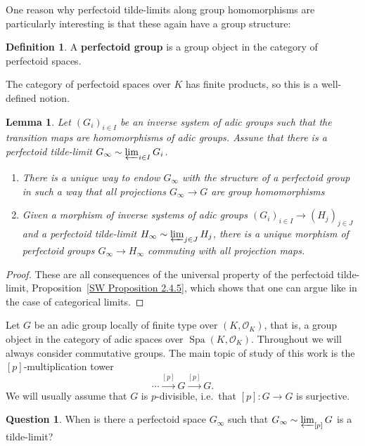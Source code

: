 \documentclass[10pt,oneside]{amsart}
\newtheorem{lemma}[theorem]{Lemma}
\theoremstyle{definition}
\newtheorem{definition}[theorem]{Definition}
\newtheorem{question}[theorem]{Question}
\newcommand{\Spa}{\operatorname{Spa}}
\renewcommand{\O}{\mathcal{O}}
\begin{document}
One reason why perfectoid tilde-limits along group homomorphisms are particularly interesting is that these again have a group structure:

\begin{definition}
	A \textbf{perfectoid group} is a group object in the category of perfectoid spaces.
\end{definition}
The category of perfectoid spaces over $K$ has finite products, so this is a well-defined notion.

\begin{lemma}\label{perfectoid tilde-limit is perfectoid group in a functorial way}
	Let $(G_i)_{i\in I}$ be an inverse system of adic groups such that the transition maps are homomorphisms of adic groups. Assune that there is a perfectoid tilde-limit $G_\infty\sim \varprojlim_{i\in I}G_i$.
	\begin{enumerate}
		\item  There is a unique way to endow $G_\infty$ with the structure of a perfectoid group in such a way that all projections $G_\infty\rightarrow G$ are group homomorphisms
		\item Given a morphism of inverse systems of adic groups $(G_i)_{i\in I}\to (H_j)_{j\in J}$ and a perfectoid tilde-limit $H_\infty\sim\varprojlim_{j\in J}H_j$, there is a unique morphism of perfectoid groups $G_\infty\rightarrow H_\infty$
		commuting with all projection maps.
	\end{enumerate}
\end{lemma}
\begin{proof}
	These are all consequences of the universal property of the perfectoid tilde-limit, Proposition~\ref{SW Proposition 2.4.5}, which shows that one can argue like in the case of categorical limits.
\end{proof}

Let $G$ be an adic group locally of finite type over $(K,\O_K)$, that is, a group object in the category of adic spaces over $\Spa(K,\O_K)$. Throughout we will always consider commutative groups. The main topic of study of this work is the $[p]$-multiplication tower
\[ \cdots\xrightarrow{[p]}G\xrightarrow{[p]}G.\]
We will usually assume that $G$ is $p$-divisible, i.e.\ that $[p]\colon G\to G$ is surjective.
\begin{question}\label{qu:tilde-limits-of-adic-groups}
	When is there a perfectoid space $G_\infty$ such that $G_\infty \sim \varprojlim_{[p]} G$ is a tilde-limit?
\end{question}
\end{document}

